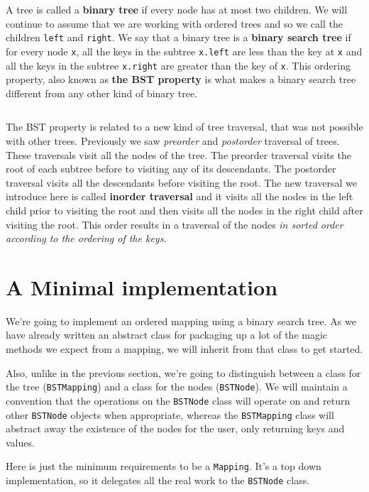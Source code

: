 A tree is called a \textbf{binary tree} if every node has at most two children.
We will continue to assume that we are working with ordered trees and so we call the children \texttt{left} and \texttt{right}.
We say that a binary tree is a \textbf{binary search tree} if for every node \texttt{x}, all the keys in the subtree \texttt{x.left} are less than the key at \texttt{x} and all the keys in the subtree \texttt{x.right} are greater than the key of \texttt{x}.  This ordering property, also known as \textbf{the BST property} is what makes a binary search tree different from any other kind of binary tree.

\begin{Verbatim}
\end{Verbatim}


The BST property is related to a new kind of tree traversal, that was not possible with other trees.
Previously we saw \emph{preorder} and \emph{postorder} traversal of trees.
These traversals visit all the nodes of the tree.
The preorder traversal visits the root of each subtree before to visiting any of its descendants.
The postorder traversal visits all the descendants before visiting the root.
The new traversal we introduce here is called \textbf{inorder traversal} and it visits all the nodes in the left child prior to visiting the root and then visits all the nodes in the right child after visiting the root.
This order results in a traversal of the nodes \emph{in sorted order according to the ordering of the keys}.

\section{A Minimal implementation}


We're going to implement an ordered mapping using a binary search tree.
As we have already written an abstract class for packaging up a lot of the magic methods we expect from a mapping, we will inherit from that class to get started.  


Also, unlike in the previous section, we're going to distinguish between a class for the tree (\texttt{BSTMapping}) and a class for the nodes (\texttt{BSTNode}).
We will maintain a convention that the operations on the \texttt{BSTNode} class will operate on and return other \texttt{BSTNode} objects when appropriate, whereas the \texttt{BSTMapping} class will abstract away the existence of the nodes for the user, only returning keys and values.


Here is just the minimum requirements to be a \texttt{Mapping}.
It's a top down implementation, so it delegates all the real work to the \texttt{BSTNode} class.

